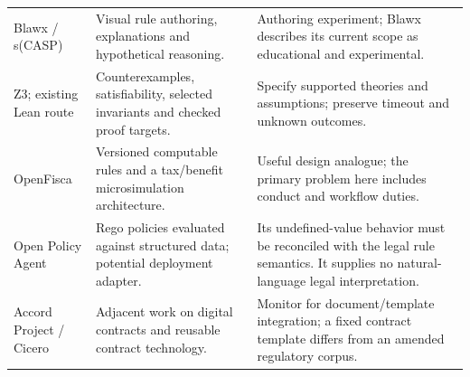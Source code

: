 \begin{longtable}{P{0.19\textwidth}P{0.37\textwidth}P{0.34\textwidth}}
Blawx / s(CASP) & Visual rule authoring, explanations and hypothetical reasoning. & Authoring experiment; Blawx describes its current scope as educational and experimental. \citep{blawxcode,slaw2024}\\
Z3; existing Lean route & Counterexamples, satisfiability, selected invariants and checked proof targets. & Specify supported theories and assumptions; preserve timeout and unknown outcomes. \citep{z3code,localrepos}\\
OpenFisca & Versioned computable rules and a tax/benefit microsimulation architecture. & Useful design analogue; the primary problem here includes conduct and workflow duties. \citep{openfiscacode}\\
Open Policy Agent & Rego policies evaluated against structured data; potential deployment adapter. & Its undefined-value behavior must be reconciled with the legal rule semantics. It supplies no natural-language legal interpretation. \citep{opadocs}\\
Accord Project / Cicero & Adjacent work on digital contracts and reusable contract technology. & Monitor for document/template integration; a fixed contract template differs from an amended regulatory corpus. \citep{cicerocode}\\
\bottomrule
\end{longtable}
\endgroup


